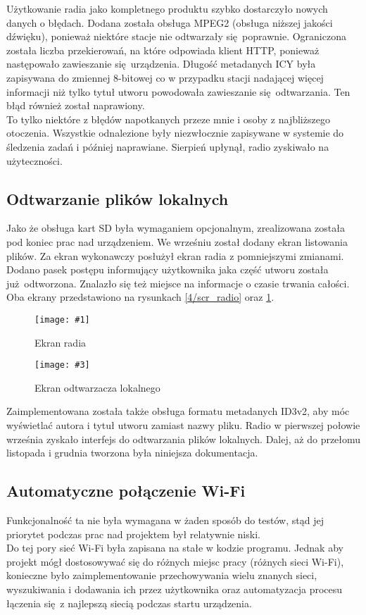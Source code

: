 \documentclass[12pt]{report}
\newcommand{\imgintss}[5]{
	\begin{figure}[{#5}]
		\centering
		\begin{minipage}{.45\textwidth}
			\centering
			\texttt{[image: \#1]}
			\caption{#2}
			\label{#1}
		\end{minipage}%
		\hfill
		\begin{minipage}{.45\textwidth}
			\centering
			\texttt{[image: \#3]}
			\caption{#4}
			\label{#3}
		\end{minipage}
	\end{figure}
}
\newcommand{\imghss}[4]{\imgintss{#1}{#2}{#3}{#4}{H}}
\begin{document}
			Użytkowanie radia jako kompletnego produktu szybko dostarczyło nowych danych o błędach. Dodana została obsługa MPEG2 (obsługa niższej jakości dźwięku), ponieważ niektóre stacje nie odtwarzały się poprawnie. Ograniczona została liczba przekierowań, na które odpowiada klient HTTP, ponieważ następowało zawieszanie się urządzenia. Długość metadanych ICY była zapisywana do zmiennej 8-bitowej co w przypadku stacji nadającej więcej informacji niż tylko tytuł utworu powodowała zawieszanie się odtwarzania. Ten błąd również został naprawiony.
			$ $\\
			
			To tylko niektóre z błędów napotkanych przeze mnie i osoby z najbliższego otoczenia. Wszystkie odnalezione były niezwłocznie zapisywane w systemie do śledzenia zadań i później naprawiane. Sierpień upłynął, radio zyskiwało na użyteczności.
			
		\subsection{Odtwarzanie plików lokalnych}
			Jako że obsługa kart SD była wymaganiem opcjonalnym, zrealizowana została pod koniec prac nad urządzeniem. We wrześniu został dodany ekran listowania plików. Za ekran wykonawczy posłużył ekran radia z pomniejszymi zmianami. Dodano pasek postępu informujący użytkownika jaka część utworu została już odtworzona. Znalazło się też miejsce na informacje o czasie trwania całości. Oba ekrany przedstawiono na rysunkach \ref{4/scr_radio} oraz \ref{4/scr_player}.
			
			\imghss{4/scr_radio}{Ekran radia}{4/scr_player}{Ekran odtwarzacza lokalnego}
			
			Zaimplementowana została także obsługa formatu metadanych ID3v2, aby móc wyświetlać autora i tytuł utworu zamiast nazwy pliku. Radio w pierwszej połowie września zyskało interfejs do odtwarzania plików lokalnych. Dalej, aż do przełomu listopada i grudnia tworzona była niniejsza dokumentacja.
			
		\subsection{Automatyczne połączenie Wi-Fi}
			Funkcjonalność ta nie była wymagana w żaden sposób do testów, stąd jej priorytet podczas prac nad projektem był relatywnie niski. 
			$ $\\

			 Do tej pory sieć Wi-Fi była zapisana na stałe w kodzie programu.  Jednak aby projekt mógł dostosowywać się do różnych miejsc pracy (różnych sieci Wi-Fi), konieczne było zaimplementowanie przechowywania wielu znanych sieci, wyszukiwania i dodawania ich przez użytkownika oraz automatyzacja procesu łączenia się z najlepszą siecią podczas startu urządzenia.
			 $ $\\
			 
\end{document}
